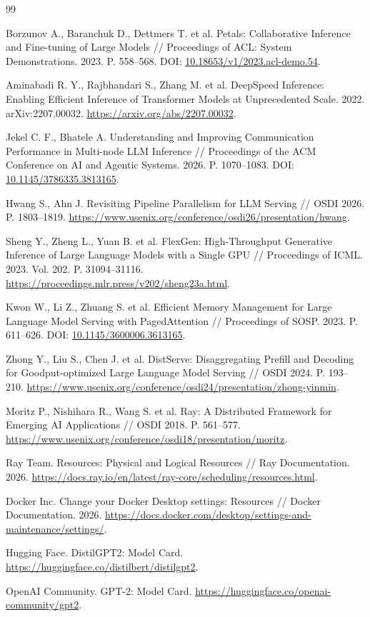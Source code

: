 \begin{thebibliography}{99}

Borzunov A., Baranchuk D., Dettmers T. et al. Petals: Collaborative Inference and Fine-tuning of Large Models // Proceedings of ACL: System Demonstrations. 2023. P. 558--568. DOI: \href{https://doi.org/10.18653/v1/2023.acl-demo.54}{10.18653/v1/2023.acl-demo.54}.

Aminabadi R. Y., Rajbhandari S., Zhang M. et al. DeepSpeed Inference: Enabling Efficient Inference of Transformer Models at Unprecedented Scale. 2022. arXiv:2207.00032. \url{https://arxiv.org/abs/2207.00032}.

Jekel C. F., Bhatele A. Understanding and Improving Communication Performance in Multi-node LLM Inference // Proceedings of the ACM Conference on AI and Agentic Systems. 2026. P. 1070--1083. DOI: \href{https://doi.org/10.1145/3786335.3813165}{10.1145/3786335.3813165}.

Hwang S., Ahn J. Revisiting Pipeline Parallelism for LLM Serving // OSDI 2026. P. 1803--1819. \url{https://www.usenix.org/conference/osdi26/presentation/hwang}.

Sheng Y., Zheng L., Yuan B. et al. FlexGen: High-Throughput Generative Inference of Large Language Models with a Single GPU // Proceedings of ICML. 2023. Vol. 202. P. 31094--31116. \url{https://proceedings.mlr.press/v202/sheng23a.html}.

Kwon W., Li Z., Zhuang S. et al. Efficient Memory Management for Large Language Model Serving with PagedAttention // Proceedings of SOSP. 2023. P. 611--626. DOI: \href{https://doi.org/10.1145/3600006.3613165}{10.1145/3600006.3613165}.

Zhong Y., Liu S., Chen J. et al. DistServe: Disaggregating Prefill and Decoding for Goodput-optimized Large Language Model Serving // OSDI 2024. P. 193--210. \url{https://www.usenix.org/conference/osdi24/presentation/zhong-yinmin}.

Moritz P., Nishihara R., Wang S. et al. Ray: A Distributed Framework for Emerging AI Applications // OSDI 2018. P. 561--577. \url{https://www.usenix.org/conference/osdi18/presentation/moritz}.

Ray Team. Resources: Physical and Logical Resources // Ray Documentation. 2026. \url{https://docs.ray.io/en/latest/ray-core/scheduling/resources.html}.

Docker Inc. Change your Docker Desktop settings: Resources // Docker Documentation. 2026. \url{https://docs.docker.com/desktop/settings-and-maintenance/settings/}.

Hugging Face. DistilGPT2: Model Card. \url{https://huggingface.co/distilbert/distilgpt2}.

OpenAI Community. GPT-2: Model Card. \url{https://huggingface.co/openai-community/gpt2}.

\end{thebibliography}

